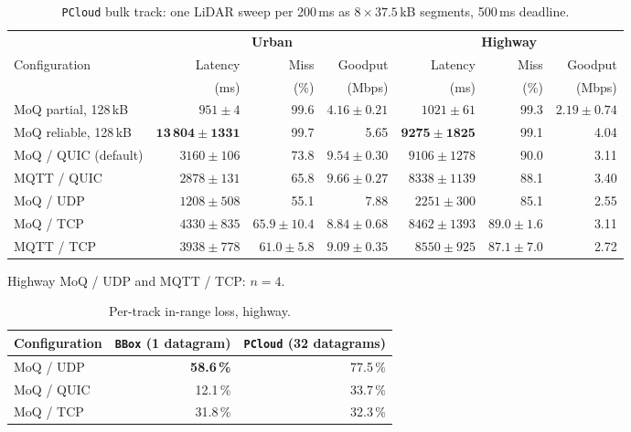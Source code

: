 \begin{table}[htbp]
  \centering
  \caption{\texttt{PCloud} bulk track: one LiDAR sweep per 200\,ms as $8 \times 37.5$\,kB
           segments, 500\,ms deadline.}
  \label{tab:rq2-pcloud}
  \begin{tabular}{@{}lrrrrrr@{}}
    \toprule
    & \multicolumn{3}{c}{\textbf{Urban}} & \multicolumn{3}{c}{\textbf{Highway}} \\
    \cmidrule(lr){2-4}\cmidrule(lr){5-7}
    Configuration
      & Latency & Miss & Goodput & Latency & Miss & Goodput \\
      & (ms)    & (\%) & (Mbps)  & (ms)    & (\%) & (Mbps)  \\
    \midrule
    MoQ partial, 128\,kB
      & $951 \pm 4$   & 99.6 & $4.16 \pm 0.21$
      & $1021 \pm 61$ & 99.3 & $2.19 \pm 0.74$ \\
    MoQ reliable, 128\,kB
      & $\mathbf{13\,804 \pm 1331}$ & 99.7 & 5.65
      & $\mathbf{9275 \pm 1825}$    & 99.1 & 4.04 \\
    MoQ / QUIC (default)
      & $3160 \pm 106$  & 73.8 & $\mathbf{9.54 \pm 0.30}$
      & $9106 \pm 1278$ & 90.0 & 3.11 \\
    MQTT / QUIC
      & $2878 \pm 131$  & 65.8 & $\mathbf{9.66 \pm 0.27}$
      & $8338 \pm 1139$ & 88.1 & 3.40 \\
    MoQ / UDP
      & $1208 \pm 508$ & 55.1 & 7.88
      & $2251 \pm 300$ & 85.1 & 2.55 \\
    MoQ / TCP
      & $4330 \pm 835$  & $65.9 \pm 10.4$ & $8.84 \pm 0.68$
      & $8462 \pm 1393$ & $89.0 \pm 1.6$  & 3.11 \\
    MQTT / TCP
      & $3938 \pm 778$ & $61.0 \pm 5.8$ & $9.09 \pm 0.35$
      & $8550 \pm 925$ & $87.1 \pm 7.0$ & 2.72 \\
    \bottomrule
  \end{tabular}

  \smallskip
  \footnotesize
  Highway MoQ / UDP and MQTT / TCP: $n = 4$.
\end{table}


\begin{table}[htbp]
  \centering
  \caption{Per-track in-range loss, highway.}
  \label{tab:udp-loss}
  \begin{tabular}{@{}lrr@{}}
    \toprule
    Configuration & \texttt{BBox} (1 datagram) & \texttt{PCloud} (32 datagrams) \\
    \midrule
    MoQ / UDP  & \textbf{58.6\,\%} & 77.5\,\% \\
    MoQ / QUIC & 12.1\,\%          & 33.7\,\% \\
    MoQ / TCP  & 31.8\,\%          & 32.3\,\% \\
    \bottomrule
  \end{tabular}
\end{table}



